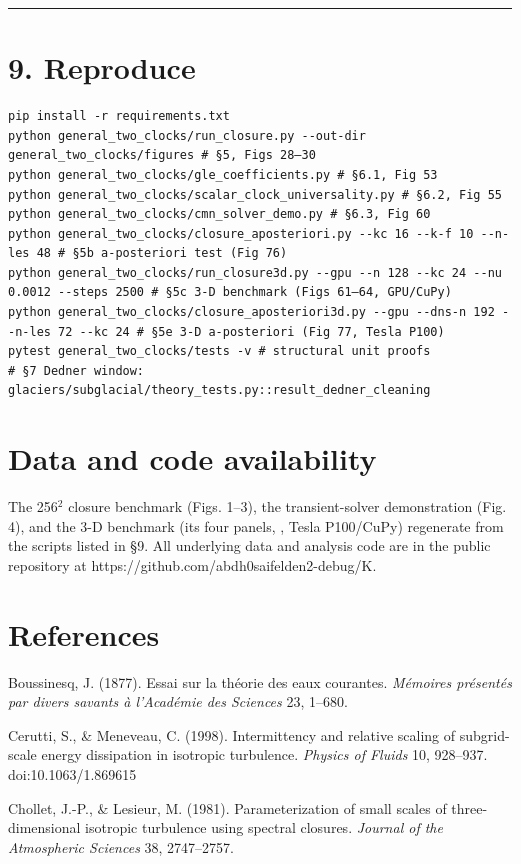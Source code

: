 \documentclass[11pt]{article}
\begin{document}
\medskip\hrule\medskip


\section*{9. Reproduce}


\begin{Verbatim}
pip install -r requirements.txt
python general_two_clocks/run_closure.py --out-dir general_two_clocks/figures # §5, Figs 28–30
python general_two_clocks/gle_coefficients.py # §6.1, Fig 53
python general_two_clocks/scalar_clock_universality.py # §6.2, Fig 55
python general_two_clocks/cmn_solver_demo.py # §6.3, Fig 60
python general_two_clocks/closure_aposteriori.py --kc 16 --k-f 10 --n-les 48 # §5b a-posteriori test (Fig 76)
python general_two_clocks/run_closure3d.py --gpu --n 128 --kc 24 --nu 0.0012 --steps 2500 # §5c 3-D benchmark (Figs 61–64, GPU/CuPy)
python general_two_clocks/closure_aposteriori3d.py --gpu --dns-n 192 --n-les 72 --kc 24 # §5e 3-D a-posteriori (Fig 77, Tesla P100)
pytest general_two_clocks/tests -v # structural unit proofs
# §7 Dedner window: glaciers/subglacial/theory_tests.py::result_dedner_cleaning
\end{Verbatim}

\section*{Data and code availability}


The 256\ensuremath{^{2}} closure benchmark (Figs. 1–3), the transient-solver demonstration (Fig. 4), and the 3-D benchmark (its four panels, , Tesla P100/CuPy) regenerate from the scripts listed in §9. All underlying data and analysis code are in the public repository at https://github.com/abdh0saifelden2-debug/K.


\section*{References}


Boussinesq, J. (1877). Essai sur la théorie des eaux courantes. \emph{Mémoires présentés par divers savants à l'Académie des Sciences} 23, 1–680.


Cerutti, S., \& Meneveau, C. (1998). Intermittency and relative scaling of subgrid-scale energy dissipation in isotropic turbulence. \emph{Physics of Fluids} 10, 928–937. doi:10.1063/1.869615


Chollet, J.-P., \& Lesieur, M. (1981). Parameterization of small scales of three-dimensional isotropic turbulence using spectral closures. \emph{Journal of the Atmospheric Sciences} 38, 2747–2757.
\end{document}
